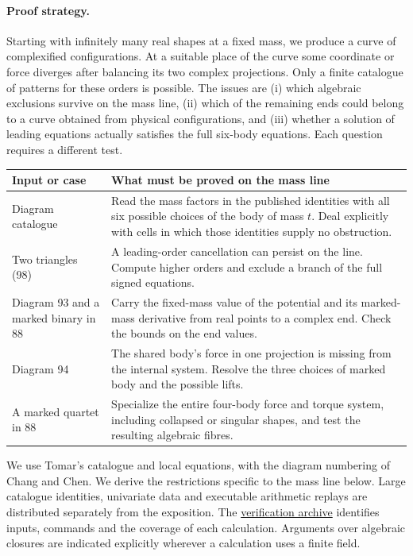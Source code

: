 \documentclass[11pt,letterpaper]{article}
\theoremstyle{definition}
\newcommand{\suppfile}{\href{https://github.com/rongyulin/physics-open-problems-AI/raw/refs/heads/main/problems/planar-central-configurations/papers/FiveEqualFiniteness-checks.zip}{verification archive}}
\begin{document}
\paragraph{Proof strategy.}
Starting with infinitely many real shapes at a fixed mass, we produce a curve of complexified configurations. At a suitable place of the curve some coordinate or force diverges after balancing its two complex projections. Only a finite catalogue of patterns for these orders is possible. The issues are (i) which algebraic exclusions survive on the mass line, (ii) which of the remaining ends could belong to a curve obtained from physical configurations, and (iii) whether a solution of leading equations actually satisfies the full six-body equations. Each question requires a different test.
\begin{center}\small
\begin{tabular}{@{}>{\raggedright\arraybackslash}p{.21\linewidth}p{.71\linewidth}@{}}
\toprule
Input or case & What must be proved on the mass line\\\midrule
Diagram catalogue & Read the mass factors in the published identities with all six possible choices of the body of mass $t$. Deal explicitly with cells in which those identities supply no obstruction.\\[2pt]
Two triangles (98) & A leading-order cancellation can persist on the line. Compute higher orders and exclude a branch of the full signed equations.\\[2pt]
Diagram 93 and a marked binary in 88 & Carry the fixed-mass value of the potential and its marked-mass derivative from real points to a complex end. Check the bounds on the end values.\\[2pt]
Diagram 94 & The shared body's force in one projection is missing from the internal system. Resolve the three choices of marked body and the possible lifts.\\[2pt]
A marked quartet in 88 & Specialize the entire four-body force and torque system, including collapsed or singular shapes, and test the resulting algebraic fibres.\\
\bottomrule
\end{tabular}
\end{center}
We use Tomar's catalogue and local equations, with the diagram numbering of Chang and Chen. We derive the restrictions specific to the mass line below. Large catalogue identities, univariate data and executable arithmetic replays are distributed separately from the exposition. The \suppfile{} identifies inputs, commands and the coverage of each calculation. Arguments over algebraic closures are indicated explicitly wherever a calculation uses a finite field.
\end{document}
